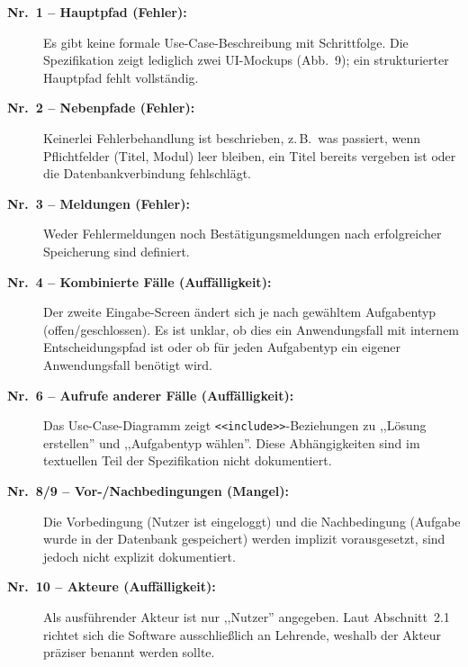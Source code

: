 \documentclass[
	fontsize=12pt,          %
	paper=a4,               %
	numbers=noenddot,       %
	listof=totoc,           %
	listof=entryprefix,     %
	listof=nochaptergap,    %
	bibliography=totoc,     %
	parskip=half,           %
	openany                 %
]{scrbook}
\begin{document}
\begin{description}
	\item[\textbf{Nr.~1 -- Hauptpfad (Fehler):}]
	Es gibt keine formale Use-Case-Beschreibung mit Schrittfolge.
	Die Spezifikation zeigt lediglich zwei UI-Mockups (Abb.~9); ein strukturierter Hauptpfad fehlt vollständig.

	\item[\textbf{Nr.~2 -- Nebenpfade (Fehler):}]
	Keinerlei Fehlerbehandlung ist beschrieben, z.\,B.\ was passiert, wenn Pflichtfelder (Titel, Modul) leer bleiben, ein Titel bereits vergeben ist oder die Datenbankverbindung fehlschlägt.

	\item[\textbf{Nr.~3 -- Meldungen (Fehler):}]
	Weder Fehlermeldungen noch Bestätigungsmeldungen nach erfolgreicher Speicherung sind definiert.

	\item[\textbf{Nr.~4 -- Kombinierte Fälle (Auffälligkeit):}]
	Der zweite Eingabe-Screen ändert sich je nach gewähltem Aufgabentyp (offen/geschlossen).
	Es ist unklar, ob dies ein Anwendungsfall mit internem Entscheidungspfad ist oder ob für jeden Aufgabentyp ein eigener Anwendungsfall benötigt wird.

	\item[\textbf{Nr.~6 -- Aufrufe anderer Fälle (Auffälligkeit):}]
	Das Use-Case-Diagramm zeigt \texttt{<<include>>}-Beziehungen zu ,,Lösung erstellen'' und ,,Aufgabentyp wählen''.
	Diese Abhängigkeiten sind im textuellen Teil der Spezifikation nicht dokumentiert.

	\item[\textbf{Nr.~8/9 -- Vor-/Nachbedingungen (Mangel):}]
	Die Vorbedingung (Nutzer ist eingeloggt) und die Nachbedingung (Aufgabe wurde in der Datenbank gespeichert) werden implizit vorausgesetzt, sind jedoch nicht explizit dokumentiert.

	\item[\textbf{Nr.~10 -- Akteure (Auffälligkeit):}]
	Als ausführender Akteur ist nur ,,Nutzer'' angegeben.
	Laut Abschnitt~2.1 richtet sich die Software ausschließlich an Lehrende, weshalb der Akteur präziser benannt werden sollte.
\end{description}

\end{document}
